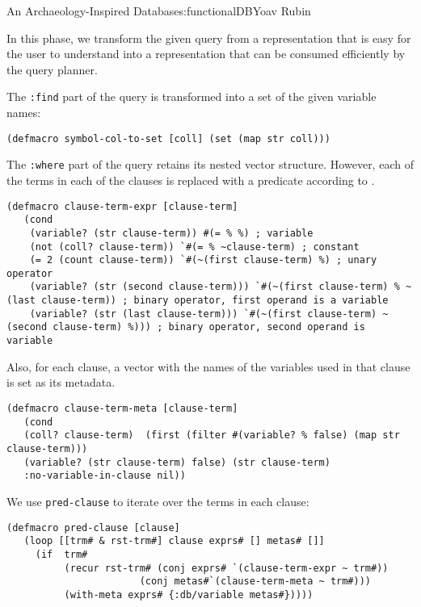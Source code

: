 \begin{aosachapter}{An Archaeology-Inspired Database}{s:functionalDB}{Yoav Rubin}
\label{phase-1-transformation}

In this phase, we transform the given query from a representation that
is easy for the user to understand into a representation that can be
consumed efficiently by the query planner.

The \texttt{:find} part of the query is transformed into a set of the
given variable names:

\begin{verbatim}
(defmacro symbol-col-to-set [coll] (set (map str coll)))
\end{verbatim}

The \texttt{:where} part of the query retains its nested vector
structure. However, each of the terms in each of the clauses is replaced
with a predicate according to .

\begin{verbatim}
(defmacro clause-term-expr [clause-term]
   (cond
    (variable? (str clause-term)) #(= % %) ; variable
    (not (coll? clause-term)) `#(= % ~clause-term) ; constant
    (= 2 (count clause-term)) `#(~(first clause-term) %) ; unary operator
    (variable? (str (second clause-term))) `#(~(first clause-term) % ~(last clause-term)) ; binary operator, first operand is a variable
    (variable? (str (last clause-term))) `#(~(first clause-term) ~(second clause-term) %))) ; binary operator, second operand is variable
\end{verbatim}

Also, for each clause, a vector with the names of the variables used in
that clause is set as its metadata.

\begin{verbatim}
(defmacro clause-term-meta [clause-term]
   (cond
   (coll? clause-term)  (first (filter #(variable? % false) (map str clause-term))) 
   (variable? (str clause-term) false) (str clause-term) 
   :no-variable-in-clause nil))
\end{verbatim}

We use \texttt{pred-clause} to iterate over the terms in each clause:

\begin{verbatim}
(defmacro pred-clause [clause]
   (loop [[trm# & rst-trm#] clause exprs# [] metas# []]
     (if  trm#
          (recur rst-trm# (conj exprs# `(clause-term-expr ~ trm#)) 
                       (conj metas#`(clause-term-meta ~ trm#)))
          (with-meta exprs# {:db/variable metas#}))))
\end{verbatim}


\end{aosachapter}
